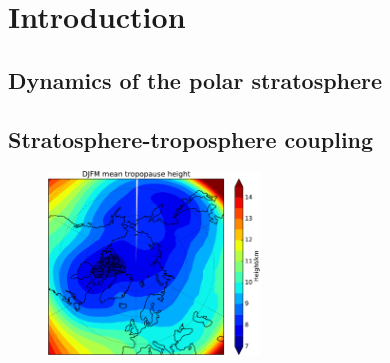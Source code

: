\chapter{Introduction}

\section{Dynamics of the polar stratosphere}


\section{Stratosphere-troposphere coupling}


\begin{figure}
 \centering
 \noindent\includegraphics[width=0.5\textwidth]{figures/chapter-intro/mean_tropopause_height.pdf}
 \caption[]{ }
 \label{fig:cmip5_mslp_diff}
\end{figure}



